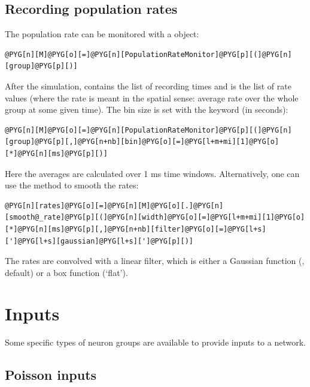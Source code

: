 \documentclass[letterpaper,10pt,english]{manual}
\begin{document}
\subsection{Recording population rates}

The population rate can be monitored with a \hyperlink{brian.PopulationRateMonitor}{} object:

\begin{Verbatim}[commandchars=@\[\]]
@PYG[n][M]@PYG[o][=]@PYG[n][PopulationRateMonitor]@PYG[p][(]@PYG[n][group]@PYG[p][)]
\end{Verbatim}

After the simulation,  contains the list of recording times and
 is the list of rate values (where the rate is meant in the spatial sense: average rate over
the whole group at some given time). The bin size is set with the  keyword (in seconds):

\begin{Verbatim}[commandchars=@\[\]]
@PYG[n][M]@PYG[o][=]@PYG[n][PopulationRateMonitor]@PYG[p][(]@PYG[n][group]@PYG[p][,]@PYG[n+nb][bin]@PYG[o][=]@PYG[l+m+mi][1]@PYG[o][*]@PYG[n][ms]@PYG[p][)]
\end{Verbatim}

Here the averages are calculated over 1 ms time windows. Alternatively, one can use the
 method to smooth the rates:

\begin{Verbatim}[commandchars=@\[\]]
@PYG[n][rates]@PYG[o][=]@PYG[n][M]@PYG[o][.]@PYG[n][smooth@_rate]@PYG[p][(]@PYG[n][width]@PYG[o][=]@PYG[l+m+mi][1]@PYG[o][*]@PYG[n][ms]@PYG[p][,]@PYG[n+nb][filter]@PYG[o][=]@PYG[l+s][']@PYG[l+s][gaussian]@PYG[l+s][']@PYG[p][)]
\end{Verbatim}

The rates are convolved with a linear filter, which is either a Gaussian function
(, default) or a box function (`flat').

\resetcurrentobjects
\hypertarget{--doc-inputs}{}

\section{Inputs}

Some specific types of neuron groups are available to provide inputs to a network.


\subsection{Poisson inputs}
\end{document}
